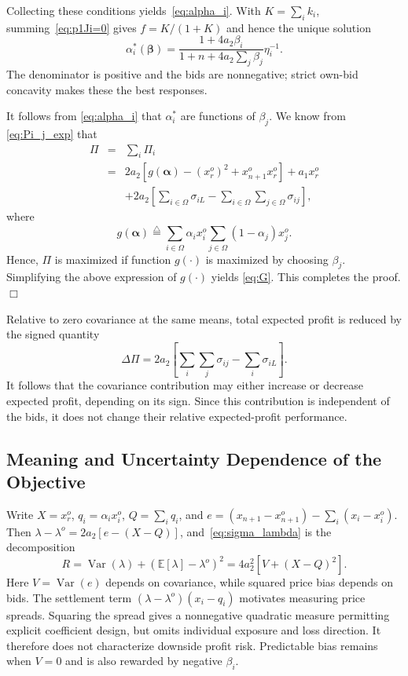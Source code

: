 \documentclass[journal]{IEEEtran}
\begin{document}
Collecting these conditions yields~\eqref{eq:alpha_i}. With $K=\sum_i k_i$, summing~\eqref{eq:p1Ji=0} gives $f=K/(1+K)$ and hence the unique solution
\begin{equation}
\alpha_i^*(\boldsymbol\beta)
=\frac{1+4a_2\beta_i}{1+n+4a_2\sum_j\beta_j}\eta_i^{-1}.
\label{eq:general_nash_closed}
\end{equation}
The denominator is positive and the bids are nonnegative; strict own-bid concavity makes these the best responses.

It follows from \eqref{eq:alpha_i} that $\alpha_i^*$ are functions of $\beta_j$. We know from  \eqref{eq:Pi_j_exp} that 
\begin{eqnarray}
    \Pi & = & \sum_i \Pi_i \nonumber \\
     & = & 2a_2\left[ g(\boldsymbol{\alpha}) - \left(x_r^o\right)^2 + x_{n+1}^o x_r^o\right]  +a_1 x_r^o  \nonumber \\ 
     && + 2a_2 \left[ \sum_{i\in\Omega} \sigma_{iL} -\sum_{i\in\Omega}\sum_{j\in\Omega}\sigma_{ij}\right], \label{eq:Pi_exp}
\end{eqnarray}
where
\[ g(\boldsymbol{\alpha}) \stackrel{\triangle}{=} \sum_{i\in\Omega}  \alpha_i x_i^o  \sum_{j\in\Omega} (1-\alpha_j ) x_j^o. \]
Hence, $\Pi$ is maximized if function $g(\cdot)$ is maximized by choosing $\beta_j$.
Simplifying the above expression of $g(\cdot)$ yields \eqref{eq:G}. This completes the proof. \hfill $\Box$

Relative to zero covariance at the same means, total expected profit is reduced by the signed quantity
\begin{equation}
 \Delta\Pi=2a_2\left[\sum_i\sum_j\sigma_{ij}-\sum_i\sigma_{iL}\right].
 \label{eq:D_P}
\end{equation}
It follows that the covariance contribution may either increase or decrease expected profit, depending on its sign. Since this contribution is independent of the bids, it does not change their relative expected-profit performance.

\subsection{Meaning and Uncertainty Dependence of the Objective}
\label{sec:risk_meaning}
Write $X=x_r^o$, $q_i=\alpha_i x_i^o$, $Q=\sum_iq_i$, and $e=(x_{n+1}-x_{n+1}^o)-\sum_i(x_i-x_i^o)$. Then $\lambda-\lambda^o=2a_2[e-(X-Q)]$, and~\eqref{eq:sigma_lambda} is the decomposition
\begin{equation}
 R=\operatorname{Var}(\lambda)+(\mathbb E[\lambda]-\lambda^o)^2
   =4a_2^2[V+(X-Q)^2]. \label{eq:risk_decomposition}
\end{equation}
Here $V=\operatorname{Var}(e)$ depends on covariance, while squared price bias depends on bids. The settlement term $(\lambda-\lambda^o)(x_i-q_i)$ motivates measuring price spreads. Squaring the spread gives a nonnegative quadratic measure permitting explicit coefficient design, but omits individual exposure and loss direction. It therefore does not characterize downside profit risk. Predictable bias remains when $V=0$ and is also rewarded by negative $\beta_i$.
\end{document}
